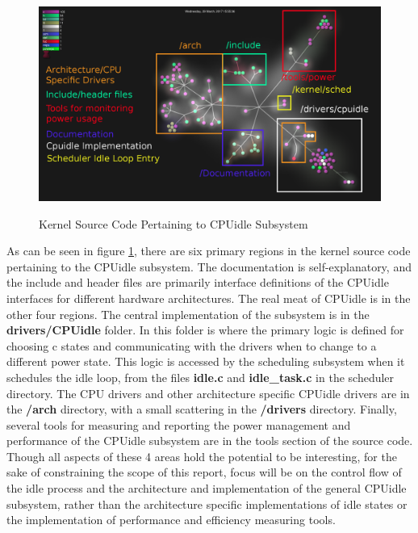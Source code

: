 \documentclass[10pt,preprint]{sigplanconf}
\begin{document}
\begin{figure}[h]
\caption{Kernel Source Code Pertaining to CPUidle Subsystem}
\centering
\includegraphics[width=\columnwidth]{cpuidle_files_web_annotated}
\label{fig:ann}
\end{figure}

As can be seen in figure \ref{fig:ann}, there are six primary regions in the kernel source code pertaining to the CPUidle subsystem. The documentation is self-explanatory, and the include and header files are primarily interface definitions of the CPUidle interfaces for different hardware architectures. The real meat of CPUidle is in the other four regions. The central implementation of the subsystem is in the \textbf{drivers/CPUidle} folder. In this folder is where the primary logic is defined for choosing c states and communicating with the drivers when to change to a different power state. This logic is accessed by the scheduling subsystem when it schedules the idle loop, from the files \textbf{idle.c} and \textbf{idle\_task.c} in the scheduler directory. The CPU drivers and other architecture specific CPUidle drivers are in the \textbf{/arch} directory, with a small scattering in the \textbf{/drivers} directory. Finally, several tools for measuring and reporting the power management and performance of the CPUidle subsystem are in the tools section of the source code. Though all aspects of these 4 areas hold the potential to be interesting, for the sake of constraining the scope of this report, focus will be on the control flow of the idle process and the architecture and implementation of the general CPUidle subsystem, rather than the architecture specific implementations of idle states or the implementation of performance and efficiency measuring tools.
\end{document}
